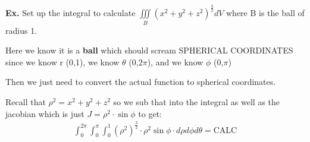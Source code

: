 \documentclass[12pt,letterpaper]{article} \usepackage{amsmath} \usepackage{graphicx} \usepackage[margin=1in]{geometry} \usepackage{longtable}  \usepackage{amssymb}
\begin{document}
	\begin{mdframed}[]
		\textbf{Ex. } Set up the integral to calculate $\iiint \limits_B \left(x^2+y^2+z^2\right)^{\frac{3}{2}} dV$ where B is the ball of radius 1.
		
		Here we know it is a \textbf{ball} which should scream SPHERICAL COORDINATES since we know r (0,1), we know $\theta$ (0,$2\pi$), and we know $\phi$ (0,$\pi$)
		
		Then we just need to convert the actual function to spherical coordinates. 
		
		Recall that $\rho^2 = x^2 + y^2 + z^2$ so we sub that into the integral as well as the jacobian which is just $J=\rho ^2 \cdot \sin\phi$ to get:
		\begin{align*}
			\int_0^{2\pi}\int_0^{\pi}\int_0^1\left(\rho^2\right)^{\frac{3}{2}} \cdot \rho^2\sin\phi \cdot d\rho d\phi d\theta = \text{CALC}
		\end{align*}
	\end{mdframed}
	
\end{document}

